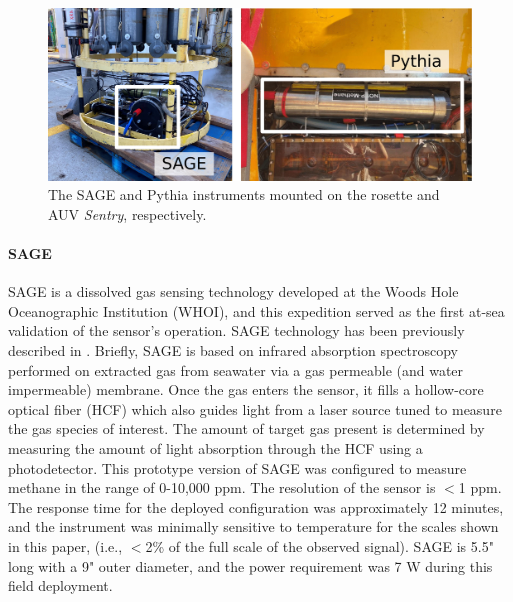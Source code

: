 \begin{figure}[h!]
    \centering
    \includegraphics[width=\columnwidth]{figures/chap3_methane_sensor_mounting.jpg}
    \caption[Images of SAGE and Pythia methane instruments]{The SAGE and Pythia instruments mounted on the rosette and AUV \emph{Sentry}, respectively.}
    \label{fig:sensor_mounting}
\end{figure}


\paragraph{SAGE}
\label{sec:sage}
SAGE is a dissolved gas sensing technology developed at the Woods Hole Oceanographic Institution (WHOI), and this expedition served as the first at-sea validation of the sensor’s operation. SAGE technology has been previously described in \cite{kapit2021dissolved, kapit2021measurement}. Briefly, SAGE is based on infrared absorption spectroscopy performed on extracted gas from seawater via a gas permeable (and water impermeable) membrane. Once the gas enters the sensor, it fills a hollow-core optical fiber (HCF) which also guides light from a laser source tuned to measure the gas species of interest. The amount of target gas present is determined by measuring the amount of light absorption through the HCF using a photodetector. This prototype version of SAGE was configured to measure methane in the range of 0-10,000 ppm. The resolution of the sensor is $<$1 ppm. The response time for the deployed configuration was approximately 12 minutes, and the instrument was minimally sensitive to temperature for the scales shown in this paper, (i.e., $<$2\% of the full scale of the observed signal). SAGE is 5.5" long with a 9" outer diameter, and the power requirement was 7 W during this field deployment.

